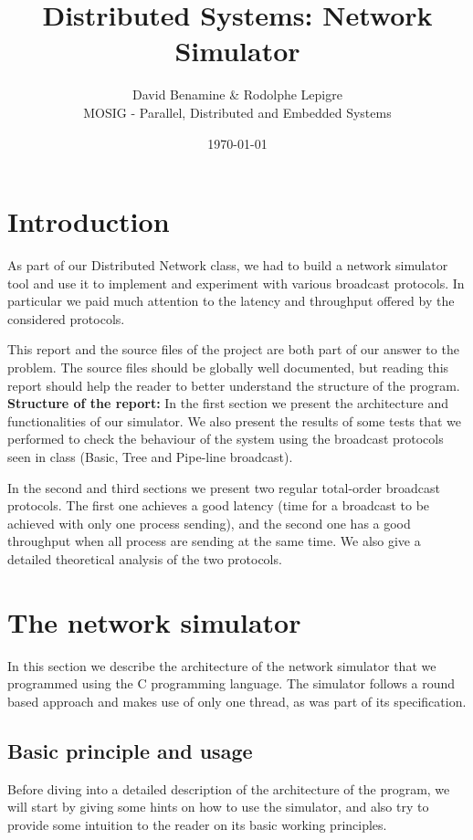 \documentclass[a4paper]{article}
\begin{document}
\title{Distributed Systems: Network Simulator}
\author{David Benamine \& Rodolphe Lepigre\\
        MOSIG - Parallel, Distributed and Embedded Systems}
\date{\today}
\maketitle

\section*{Introduction}
As part of our Distributed Network class, we had to build a network simulator
tool and use it to implement and experiment with various broadcast protocols.
In particular we paid much attention to the latency and throughput offered by
the considered protocols.

This report and the source files of the project are both part of our answer to
the problem. The source files should be globally well documented, but reading
this report should help the reader to better understand the structure of the
program.\\

\noindent\textbf{Structure of the report:} In the first section we present the
architecture and functionalities of our simulator. We also present the results
of some tests that we performed to check the behaviour of the system using the
broadcast protocols seen in class (Basic, Tree and Pipe-line broadcast).

In the second and third sections we present two regular total-order broadcast
protocols. The first one achieves a good latency (time for a broadcast to be
achieved with only one process sending), and the second one has a good
throughput when all process are sending at the same time. We also give a
detailed theoretical analysis of the two protocols.

\section{The network simulator}
In this section we describe the architecture of the network simulator that we
programmed using the C programming language. The simulator follows a round
based approach and makes use of only one thread, as was part of its
specification.

\subsection{Basic principle and usage}
Before diving into a detailed description of the architecture of the program,
we will start by giving some hints on how to use the simulator, and also try
to provide some intuition to the reader on its basic working principles.
\end{document}
